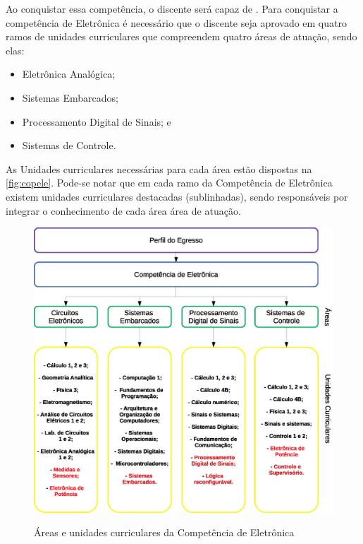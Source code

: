 Ao conquistar essa competência, o discente será capaz de \textbf{\compTron}. Para conquistar a competência de Eletrônica é necessário que o discente seja aprovado em quatro ramos de unidades curriculares que compreendem quatro áreas de atuação, sendo elas:

\begin{itemize}
    \item Eletrônica Analógica;
    \item Sistemas Embarcados;
    \item Processamento Digital de Sinais; e
    \item Sistemas de Controle.
\end{itemize}

As Unidades curriculares necessárias para cada área estão dispostas na \autoref{fig:copele}. Pode-se notar que em cada ramo da Competência de Eletrônica existem unidades curriculares destacadas (sublinhadas), sendo responsáveis por integrar o conhecimento de cada área área de atuação.

\begin{figure}[!htb]
    \centering
    \caption[Áreas e unidades curriculares da Competência de Eletrônica]{Áreas e unidades curriculares da Competência de Eletrônica}
    \includegraphics[width=1.0\textwidth]{Caps/Figs/comp_eletronica.eps}
    \fonte{\utf}
    \label{fig:copele}
\end{figure}

